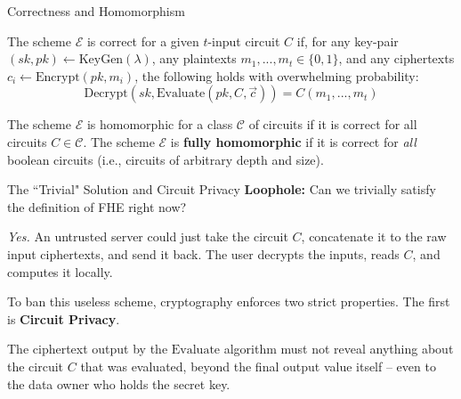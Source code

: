 \documentclass[10pt]{beamer}
\newtheorem{intuition}{Intuition}
\begin{document}
\begin{frame}{Correctness and Homomorphism}
    \begin{definition}
    The scheme $\mathcal{E}$ is correct for a given $t$-input circuit $C$ if, for any key-pair $(sk,pk)\leftarrow \text{KeyGen}(\lambda)$, any plaintexts $m_{1},...,m_{t}\in\{0,1\}$, and any ciphertexts $c_{i}\leftarrow \text{Encrypt}(pk,m_{i})$, the following holds with overwhelming probability:
    $$\text{Decrypt}(sk,\text{Evaluate}(pk,C,\vec{c}))=C(m_{1},...,m_{t})$$
    \end{definition}
    \pause

    \vspace{0.3cm}
    \begin{definition}
    The scheme $\mathcal{E}$ is homomorphic for a class $\mathcal{C}$ of circuits if it is correct for all circuits $C\in\mathcal{C}$. The scheme $\mathcal{E}$ is \textbf{fully homomorphic} if it is correct for \textit{all} boolean circuits (i.e., circuits of arbitrary depth and size).
    \end{definition}
\end{frame}

\begin{frame}{The ``Trivial" Solution and Circuit Privacy}
    \textbf{Loophole:} Can we trivially satisfy the definition of FHE right now? 
    \pause
    
    \textit{Yes.} An untrusted server could just take the circuit $C$, concatenate it to the raw input ciphertexts, and send it back. The user decrypts the inputs, reads $C$, and computes it locally.
    \pause
    
    To ban this useless scheme, cryptography enforces two strict properties. The first is \textbf{Circuit Privacy}.
    \pause

    \begin{definition}
    The ciphertext output by the $\text{Evaluate}$ algorithm must not reveal anything about the circuit $C$ that was evaluated, beyond the final output value itself -- even to the data owner who holds the secret key.
    \end{definition}
    \pause

\end{frame}
\end{document}
